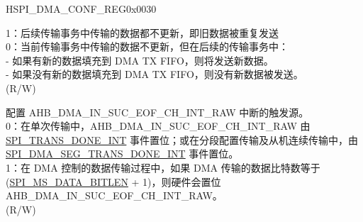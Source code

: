 \begin{register}{H}{SPI\_DMA\_CONF\_REG}{0x0030}
\begin{regdesc}
\begin{reglist}
1：后续传输事务中传输的数据都不更新，即旧数据被重复发送\\
0：当前传输事务中传输的数据不更新，但在后续的传输事务中：\\
        - 如果有新的数据填充到 DMA TX FIFO，则将发送新数据。\\
        - 如果没有新的数据填充到 DMA TX FIFO，则没有新数据被发送。\\
(R/W)
\label{fielddesc:SPIRXEOFEN}\item [SPI\_RX\_EOF\_EN] 配置 AHB\_DMA\_IN\_SUC\_EOF\_CH\_INT\_RAW 中断的触发源。\\
0：在单次传输中，AHB\_DMA\_IN\_SUC\_EOF\_CH\_INT\_RAW 由 \hyperref[int:SPITRANSDONEINT]{SPI\_TRANS\_DONE\_INT} 事件置位；或在分段配置传输及从机连续传输中，由 \hyperref[int:SPIDMASEGTRANSDONEINT]{SPI\_DMA\_SEG\_TRANS\_DONE\_INT} 事件置位。\\
 1：在 DMA 控制的数据传输过程中，如果 DMA 传输的数据比特数等于 (\hyperref[fielddesc:SPIMSDATABITLEN]{SPI\_MS\_DATA\_BITLEN} + 1)，则硬件会置位 AHB\_DMA\_IN\_SUC\_EOF\_CH\_INT\_RAW。\\
(R/W)
\item [见下页]
\end{reglist}\end{regdesc}
\end{register}

